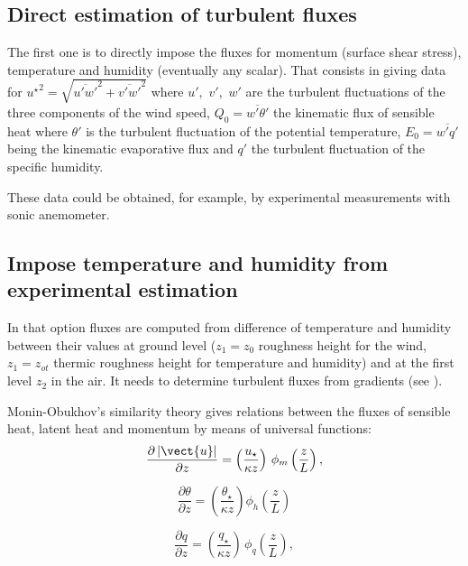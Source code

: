 \subsection{Direct estimation of turbulent fluxes}
The first one is to directly impose the fluxes for momentum (surface shear stress), temperature and
humidity (eventually any scalar). That consists in giving data for
${u^{\star}} ^2 =\sqrt {\overline {u'w'}^{2}+\overline {v'w'}^{2}} $ where
$u',\,\,v',\,\,w'$ are the turbulent fluctuations of
the three components of the wind speed,
\newline
\newline
$Q_{0} =\overline{w'\theta'}$ the kinematic flux of sensible heat where
$\theta '$ is the turbulent fluctuation of the potential temperature,
\newline
\newline
$E_{0} =\overline {w'q'} $ being the kinematic
evaporative flux and $q'$ the turbulent fluctuation of the specific
humidity.

These data could be obtained, for example, by experimental
measurements with sonic anemometer.

\subsection{Impose temperature and humidity from experimental estimation}
In that option fluxes are computed from difference of temperature and
humidity between their values at ground level ($z_{1}=z_{0}$ roughness
height for the wind, $z_{1}=z_{ot}$ thermic roughness height for
temperature and humidity) and at the first level $z_{2}$ in the air.
It needs to determine turbulent fluxes from gradients (see \cite{Musson_Genon:2007}).

Monin-Obukhov's similarity theory gives relations between the fluxes of
sensible heat, latent heat and momentum by means of universal functions:
\begin{equation}
\label{eq:atmo:eq5}
\frac{\partial \left| {\vect{u}} \right|}{\partial z} =
\left( {\frac{{u}_{{\star }} }{\kappa z}} \right) \, \phi_{m} \left(
{\dfrac{z}{L}} \right),
\end{equation}

\begin{equation}
\label{eq:atmo:eq6}
\frac{\partial {\theta }}{\partial z}=\left( {\frac{\theta_{\star}}{\kappa z}} \right)\phi_{h} \left({\frac{z}{L}} \right)
\end{equation}

\begin{equation}
\label{eq:atmo:eq7}
\frac{\partial q}{\partial z}=\left(
{\frac{q_{\star} }{\kappa z}} \right) \,
\phi_{q} \left(
{\frac{z}{L}} \right),
\end{equation}


